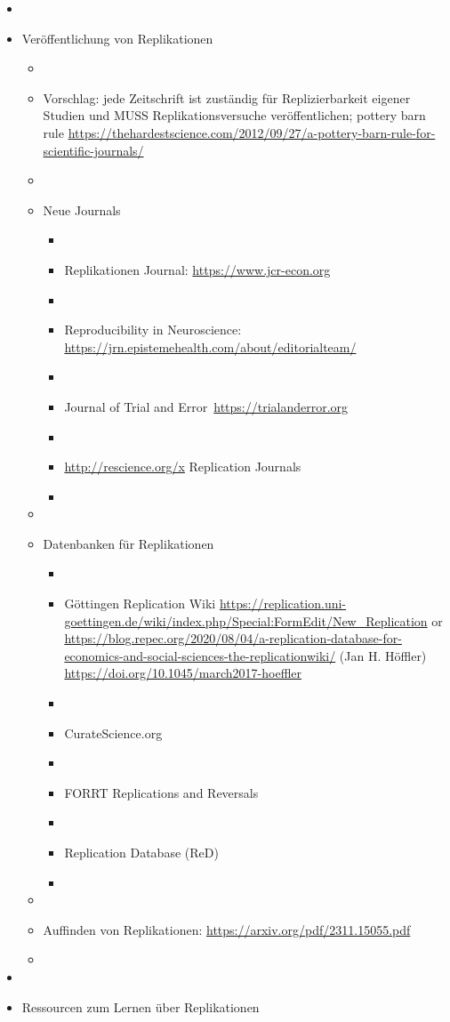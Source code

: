\documentclass[
  letterpaper,
  DIV=11,
  numbers=noendperiod]{scrreprt}
\begin{document}
\begin{itemize}
\item
\item
  Veröffentlichung von Replikationen

  \begin{itemize}
  \item
  \item
    Vorschlag: jede Zeitschrift ist zuständig für Replizierbarkeit
    eigener Studien und MUSS Replikationsversuche veröffentlichen;
    pottery barn rule
    \url{https://thehardestscience.com/2012/09/27/a-pottery-barn-rule-for-scientific-journals/}
  \item
  \item
    Neue Journals

    \begin{itemize}
    \item
    \item
      Replikationen Journal: \url{https://www.jcr-econ.org}
    \item
    \item
      Reproducibility in Neuroscience:
      \url{https://jrn.epistemehealth.com/about/editorialteam/}
    \item
    \item
      Journal of Trial and Error~\url{https://trialanderror.org}
    \item
    \item
      \url{http://rescience.org/x} Replication Journals
    \item
    \end{itemize}
  \item
  \item
    Datenbanken für Replikationen

    \begin{itemize}
    \item
    \item
      Göttingen Replication Wiki
      \url{https://replication.uni-goettingen.de/wiki/index.php/Special:FormEdit/New_Replication}
      or
      \url{https://blog.repec.org/2020/08/04/a-replication-database-for-economics-and-social-sciences-the-replicationwiki/}
      (Jan H. Höffler) \url{https://doi.org/10.1045/march2017-hoeffler}
    \item
    \item
      CurateScience.org
    \item
    \item
      FORRT Replications and Reversals
    \item
    \item
      Replication Database (ReD)
    \item
    \end{itemize}
  \item
  \item
    Auffinden von Replikationen:
    \url{https://arxiv.org/pdf/2311.15055.pdf}
  \item
  \end{itemize}
\item
\item
  Ressourcen zum Lernen über Replikationen


\end{itemize}
\end{document}
